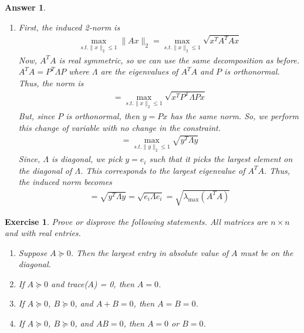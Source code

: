 \documentclass[12pt]{article}
\theoremstyle{colon}
\newtheorem{exercise}{Exercise}
\newtheorem*{answer}{Answer}
\begin{document}
\begin{answer}
\begin{enumerate}[label=\arabic*)]
    \item First, the induced 2-norm is
      \begin{gather*}
        \max_{s.t. \lVert x \rVert_2 \leq 1} \lVert A x \rVert_2 = \max_{s.t. \lVert x \rVert_2 \leq 1} \sqrt{x^T A^T A x}
      \end{gather*}
      Now, $A^T A$ is real symmetric, so we can use the same decomposition as before. $A^T A = P^T \Lambda P$ where $\Lambda$ are the eigenvalues of $A^T A$ and $P$ is orthonormal. Thus, the norm is
      \begin{gather*}
        = \max_{s.t. \lVert x \rVert_2 \leq 1} \sqrt{x^T P^T \Lambda P x}
      \end{gather*}
      But, since $P$ is orthonormal, then $y = P x$ has the same norm. So, we perform this change of variable with no change in the constraint.
      \begin{gather*}
        = \max_{s.t. \lVert y \rVert_2 \leq 1} \sqrt{y^T \Lambda y}
      \end{gather*}
      Since, $\Lambda$ is diagonal, we pick $y = e_i$ such that it picks the largest element on the diagonal of $\Lambda$. This corresponds to the largest eigenvalue of $A^T A$. Thus, the induced norm becomes
      \begin{gather*}
        = \sqrt{y^T \Lambda y} = \sqrt{e_i \Lambda e_i} = \sqrt{\lambda_{\text{max}} (A^T A)}
      \end{gather*}
  \end{enumerate}
\end{answer}

\clearpage

\begin{exercise}
  Prove or disprove the following statements. All matrices are $n \times n$ and with real entries.
  \begin{enumerate}[label=\alph*)]
    \item Suppose $A \succeq 0$. Then the largest entry in absolute value of $A$ must be on the diagonal.
    \item If $A \succeq 0$ and trace($A$) = 0, then $A = 0$.
    \item If $A \succeq 0$, $B \succeq 0$, and $A+B = 0$, then $A = B = 0$.
    \item If $A \succeq 0$, $B \succeq 0$, and $AB = 0$, then $A = 0$ or $B = 0$.
  \end{enumerate}
\end{exercise}
\end{document}
